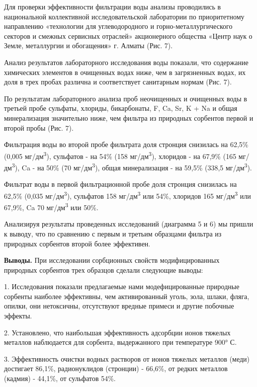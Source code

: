\begin{multicols}{2}
Для проверки эффективности фильтрации воды анализы проводились в
национальной коллективной исследовательской лаборатории по приоритетному
направлению «технологии для углеводородного и горно-металлургического
секторов и смежных сервисных отраслей» акционерного общества «Центр наук
о Земле, металлургии и обогащения» г. Алматы (Рис. 7).

Анализ результатов лабораторного исследования воды показали, что
содержание химических элементов в очищенных водах ниже, чем в
загрязненных водах, их доля в трех пробах различна и соответствует
санитарным нормам (Рис. 7).

По результатам лабораторного анализа проб неочищенных и очищенных воды в
третьей пробе сульфаты, хлориды, бикарбонаты, F, Ca, Sr, K + Na и общая
минерализация значительно ниже, чем фильтра из природных сорбентов
первой и второй пробы (Рис. 7).

Фильтрация воды во второй пробе фильтрата доля стронция снизилась на
62,5\% (0,005 мг/дм\textsuperscript{3}), сульфатов - на 54\% (158
мг/дм\textsuperscript{3}), хлоридов - на 67,9\% (165
мг/дм\textsuperscript{3}), Ca - на 50\% (70 мг/дм\textsuperscript{3}),
общая минерализация - на 59,5\% (338,5 мг/дм\textsuperscript{3}).

Фильтрат воды в первой фильтрационной пробе доля стронция снизилась на
62,5\% (0,035 мг/дм\textsuperscript{3}), сульфатов 158
мг/дм\textsuperscript{3} или 54\%, хлоридов 165 мг/дм\textsuperscript{3}
или 67,9\%, Ca 70 мг/дм\textsuperscript{3} или 50\%.

Анализируя результаты проведенных исследований (диаграмма 5 и 6) мы
пришли к выводу, что по сравнению с первым и третьим образцами фильтра
из природных сорбентов второй более эффективен.

{\bfseries Выводы.} При исследовании сорбционных свойств модифицированных
природных сорбентов трех образцов сделали следующие выводы:

1. Исследования показали предлагаемые нами модефицированные природные
сорбенты наиболее эффективны, чем активированный уголь, зола, шлаки,
фляга, опилки, они нетоксичны, отсутствуют вредные примеси и другие
побочные эффекты.

2. Установлено, что наибольшая эффективность адсорбции ионов тяжелых
металлов наблюдается для сорбента, выдержанного при температуре 900° С.

3. Эффективность очистки водных растворов от ионов тяжелых металлов
(меди) достигает 86,1\%, радионуклидов (стронции) - 66,6\%, от редких
металлов (кадмия) - 44,1\%, от сульфатов 54\%.


\end{multicols}
